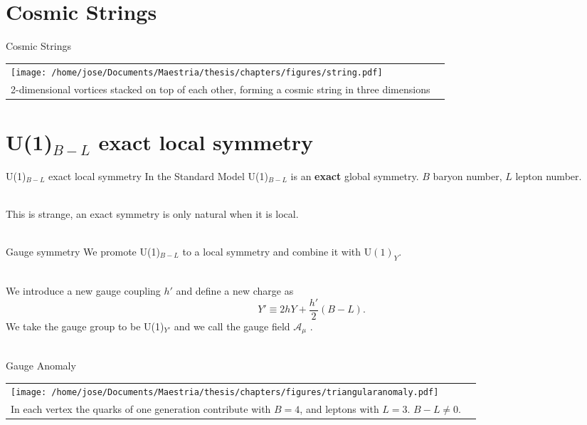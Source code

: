 \documentclass[14pt]{beamer}
\begin{document}
\section{Cosmic Strings}
\begin{frame}{Cosmic Strings}
\begin{tabular}{@{} *{2}{C{\linewidth}} }
  \texttt{[image: /home/jose/Documents/Maestria/thesis/chapters/figures/string.pdf]} \\[\abovecaptionskip]
 2-dimensional vortices stacked on top of each other, forming a cosmic string in three dimensions 
\end{tabular}
	

\end{frame}



\section{U(1)$_{B-L}$ exact local symmetry}
\begin{frame}{U(1)$_{B-L}$ exact local symmetry}
In the Standard Model U(1)$_{B-L}$ is an \textbf{exact} global symmetry. $B$ baryon number, $L$ lepton number.\\~\

This is strange, an exact symmetry is only natural when it is local.\\~\
\end{frame}

\begin{frame}{Gauge symmetry}
We promote U(1)$_{B-L}$ to a local symmetry and combine it with U$(1)_Y$. \\~\

We introduce a new gauge coupling $h'$ and define a new charge as
	$$Y' \equiv 2hY + \frac{h'}{2}(B-L).$$
We take the gauge group to be U(1)$_{Y'}$ and we call the gauge field $\mathcal{A}_{\mu}$ .\\~\
\end{frame}


\begin{frame}{Gauge Anomaly}

\begin{tabular}{@{} *{2}{C{\linewidth}} }
  \texttt{[image: /home/jose/Documents/Maestria/thesis/chapters/figures/triangularanomaly.pdf]} \\[\abovecaptionskip]
In each vertex the quarks of one generation contribute with $B=4$, and leptons with $L=3$. $B-L\neq 0$.
\end{tabular}
\end{frame}
\end{document}
